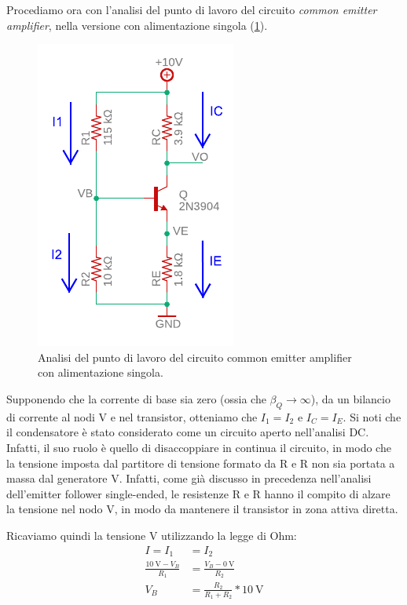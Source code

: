 Procediamo ora con l'analisi del punto di lavoro del circuito \textit{common emitter amplifier}, nella versione con alimentazione singola (\Fig\ref{fig:commonemitter_se_DC}).
\begin{figure}[h!]
	\centering
	\includegraphics[width=0.4\linewidth]{./OtherFiles/Laboratorio 3/common emitter_se-punto di lavoro-printout}
	\caption{Analisi del punto di lavoro del circuito common emitter amplifier con alimentazione singola.}
	\label{fig:commonemitter_se_DC}
\end{figure}
Supponendo che la corrente di base sia zero (ossia che $\beta_Q\to\infty$), da un bilancio di corrente al nodi V e nel transistor, otteniamo che $I_1=I_2$ e $I_C=I_E$. Si noti che il condensatore è stato considerato come un circuito aperto nell'analisi DC. Infatti, il suo ruolo è quello di disaccoppiare in continua il circuito, in modo che la tensione imposta dal partitore di tensione formato da R e R non sia portata a massa dal generatore V. Infatti, come già discusso in precedenza nell'analisi dell'emitter follower single-ended, le resistenze R e R hanno il compito di alzare la tensione nel nodo V, in modo da mantenere il transistor in zona attiva diretta.

Ricaviamo quindi la tensione V utilizzando la legge di Ohm:
\begin{equation}
	\begin{split}
		I=I_1&=I_2 \\
		\frac{\SI{10}{\volt}-V_B}{R_1}&=\frac{V_B-\SI{0}{\volt}}{R_2} \\
		V_B&=\frac{R_2}{R_1+R_2}*\SI{10}{\volt}
	\end{split}
\end{equation}

